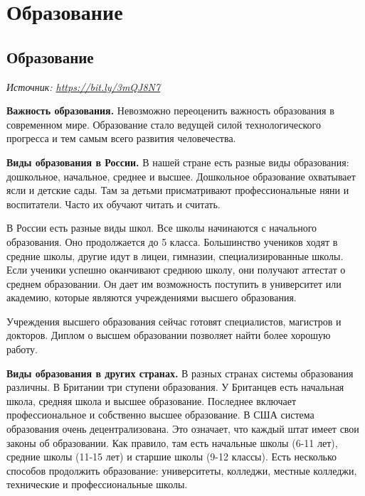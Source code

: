 \chapter{Образование}

\section{Образование}

\textit{Источник: \url{https://bit.ly/3mQJ8N7}}

\textbf{Важность образования.}
Невозможно переоценить важность образования в современном мире. Образование стало ведущей силой технологического прогресса и тем самым всего развития человечества.

\textbf{Виды образования в России.}
В нашей стране есть разные виды образования: дошкольное, начальное, среднее и высшее.
Дошкольное образование охватывает ясли и детские сады. Там за детьми присматривают профессиональные няни и воспитатели. Часто их обучают читать и считать.

В России есть разные виды школ. Все школы начинаются с начального образования. Оно продолжается до 5 класса. Большинство учеников ходят в средние школы, другие идут в лицеи, гимназии, специализированные школы. Если ученики успешно оканчивают среднюю школу, они получают аттестат о среднем образовании. Он дает им возможность поступить в университет или академию, которые являются учреждениями высшего образования.

Учреждения высшего образования сейчас готовят специалистов, магистров и докторов. Диплом о высшем образовании позволяет найти более хорошую работу.

\textbf{Виды образования в других странах.}
В разных странах системы образования различны. В Британии три ступени образования. У Британцев есть начальная школа, средняя школа и высшее образование. Последнее включает профессиональное и собственно высшее образование.
В США система образования очень децентрализована. Это означает, что каждый штат имеет свои законы об образовании. Как правило, там есть начальные школы (6-11 лет), средние школы (11-15 лет) и старшие школы (9-12 классы). Есть несколько способов продолжить образование: университеты, колледжи, местные колледжи, технические и профессиональные школы.